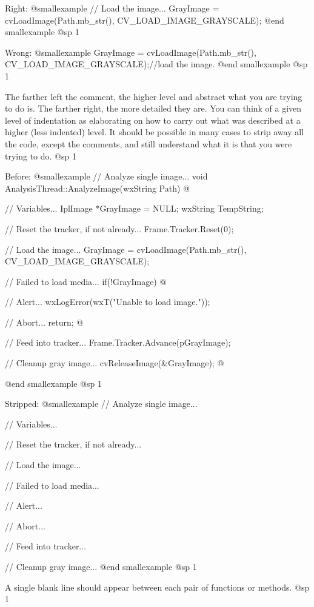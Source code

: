 Right:
@smallexample
// Load the image...
GrayImage = cvLoadImage(Path.mb_str(), CV_LOAD_IMAGE_GRAYSCALE);
@end smallexample
@sp 1

Wrong:
@smallexample
GrayImage = cvLoadImage(Path.mb_str(), CV_LOAD_IMAGE_GRAYSCALE);//load the image.
@end smallexample
@sp 1

\item
The farther left the comment, the higher level and abstract what you are trying to do is. The farther right, the more detailed they are. You can think of a given level of indentation as elaborating on how to carry out what was described at a higher (less indented) level. It should be possible in many cases to strip away all the code, except the comments, and still understand what it is that you were trying to do.
@sp 1

Before:
@smallexample
// Analyze single image...
void AnalysisThread::AnalyzeImage(wxString Path)
@{
    // Variables...
    IplImage   *GrayImage   = NULL;
    wxString    TempString;

    // Reset the tracker, if not already...
    Frame.Tracker.Reset(0);

    // Load the image...
    GrayImage = cvLoadImage(Path.mb_str(), CV_LOAD_IMAGE_GRAYSCALE);

        // Failed to load media...
        if(!GrayImage)
        @{
            // Alert...
            wxLogError(wxT("Unable to load image."));
            
            // Abort...
            return;
        @}

    // Feed into tracker...
    Frame.Tracker.Advance(pGrayImage);
    
    // Cleanup gray image...
    cvReleaseImage(&GrayImage);
@}
@end smallexample
@sp 1

Stripped:
@smallexample
// Analyze single image...

    // Variables...

    // Reset the tracker, if not already...

    // Load the image...

        // Failed to load media...

            // Alert...

            // Abort...

    // Feed into tracker...
    
    // Cleanup gray image...
@end smallexample
@sp 1

\item
A single blank line should appear between each pair of functions or methods. 
@sp 1

